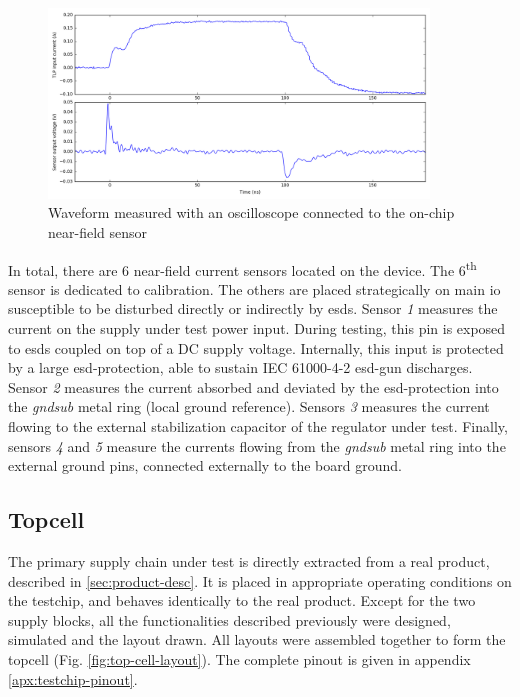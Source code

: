 \begin{figure}[!h]
  \centering
  \includegraphics[width=0.9\textwidth]{src/3/figures/measured_waveform.png}
  \caption{Waveform measured with an oscilloscope connected to the on-chip near-field sensor}
  \label{fig:nfs-wvf}
\end{figure}

In total, there are 6 near-field current sensors located on the device.
The 6\textsuperscript{th} sensor is dedicated to calibration.
The others are placed strategically on main \gls{io} susceptible to be disturbed directly or indirectly by \gls{esd}s.
Sensor \textit{1} measures the current on the supply under test power input.
During testing, this pin is exposed to \gls{esd}s coupled on top of a DC supply voltage.
Internally, this input is protected by a large \gls{esd-protection}, able to sustain IEC 61000-4-2 \gls{esd-gun} discharges.
Sensor \textit{2} measures the current absorbed and deviated by the \gls{esd-protection} into the \textit{gndsub} metal ring (local ground reference).
Sensors \textit{3} measures the current flowing to the external stabilization capacitor of the regulator under test.
Finally, sensors \textit{4} and \textit{5} measure the currents flowing from the \textit{gndsub} metal ring into the external ground pins, connected externally to the board ground.

\subsection{Topcell}

%
The primary supply chain under test is directly extracted from a real product, described in \ref{sec:product-desc}.
It is placed in appropriate operating conditions on the testchip, and behaves identically to the real product.
Except for the two supply blocks, all the functionalities described previously were designed, simulated and the layout drawn.
All layouts were assembled together to form the topcell (Fig. \ref{fig:top-cell-layout}).
The complete pinout is given in appendix \ref{apx:testchip-pinout}.

